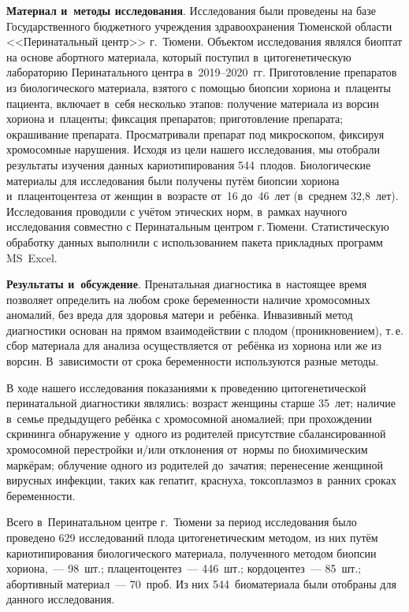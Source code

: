 \textbf{Материал и~методы исследования}. Исследования были проведены на базе Государственного бюджетного учреждения здравоохранения Тюменской области <<Перинатальный центр>> г.~Тюмени. Объектом исследования являлся биоптат на основе абортного материала, который поступил в~цитогенетическую лабораторию Перинатального центра в~2019--2020~гг. Приготовление препаратов из биологического материала, взятого с помощью биопсии хориона и~плаценты пациента, включает в~себя несколько этапов: получение материала из ворсин хориона и~плаценты; фиксация препаратов; приготовление препарата; окрашивание препарата. Просматривали препарат под микроскопом, фиксируя хромосомные нарушения. Исходя из цели нашего исследования, мы отобрали результаты изучения данных кариотипирования 544~плодов. Биологические материалы для исследования были получены путём биопсии хориона и~плацентоцентеза от женщин в~возрасте от~16 до~46~лет (в~среднем 32,8~лет).  Исследования проводили с учётом этических норм, в~рамках научного исследования совместно с Перинатальным центром г.\,Тюмени. Статистическую обработку данных выполнили с использованием пакета прикладных программ MS~Excel.

\textbf{Результаты и~обсуждение}. Пренатальная диагностика в~настоящее время позволяет определить на любом сроке беременности наличие хромосомных аномалий, без вреда для здоровья матери и~ребёнка. Инвазивный метод диагностики основан на прямом взаимодействии с плодом (проникновением), т.\,е. сбор материала для анализа осуществляется от~ребёнка из хориона или же из ворсин. В~зависимости от срока беременности используются разные методы.

В ходе нашего исследования показаниями к проведению цитогенетической перинатальной диагностики являлись: возраст женщины старше 35~лет; наличие в~семье предыдущего ребёнка с хромосомной аномалией; при прохождении скрининга обнаружение у~одного из родителей присутствие сбалансированной хромосомной перестройки и/или отклонения от~нормы по биохимическим маркёрам; облучение одного из родителей до~зачатия; перенесение женщиной вирусных инфекции, таких как гепатит, краснуха, токсоплазмоз в~ранних сроках беременности.

Всего в~Перинатальном центре г.~Тюмени за период исследования было проведено 629 исследований плода цитогенетическим методом, из них путём кариотипирования биологического материала, полученного методом биопсии хориона,~--- 98~шт.; плацентоцентез~--- 446~шт.; кордоцентез~--- 85~шт.; абортивный материал~--- 70~проб. Из них 544~биоматериала были отобраны для данного исследования.

